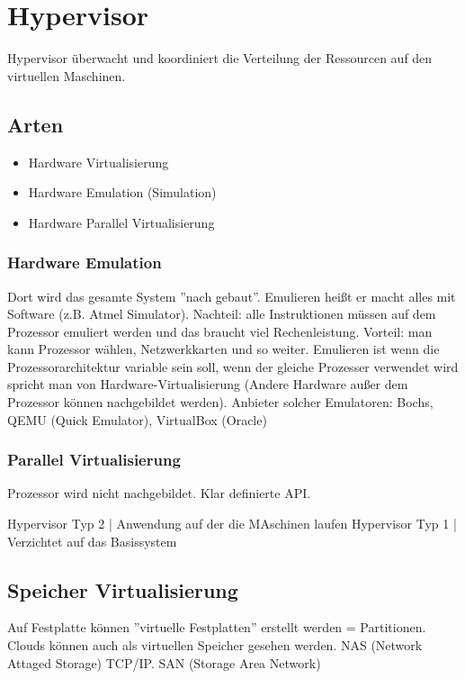 \documentclass[a4paper]{report}
\begin{document}
\section{Hypervisor}

Hypervisor überwacht und koordiniert die Verteilung der Ressourcen auf den virtuellen Maschinen. 

 \subsection{Arten}
 
\begin{itemize}
\item Hardware Virtualisierung
\item Hardware Emulation (Simulation)
\item Hardware Parallel Virtualisierung
\end{itemize}


\subsubsection{Hardware Emulation}

Dort wird das gesamte System ''nach gebaut''. Emulieren heißt er macht alles mit Software (z.B. Atmel Simulator). Nachteil: alle Instruktionen müssen auf dem Prozessor emuliert werden und das braucht viel Rechenleistung. Vorteil: man kann Prozessor wählen, Netzwerkkarten und so weiter. Emulieren ist wenn die Prozessorarchitektur variable sein soll, wenn der gleiche Prozesser verwendet wird spricht man von Hardware-Virtualisierung (Andere Hardware außer dem Prozessor können nachgebildet werden).
\newline
\newline
Anbieter solcher Emulatoren: Bochs, QEMU (Quick Emulator), VirtualBox (Oracle)

\subsubsection{Parallel Virtualisierung}

Prozessor wird nicht nachgebildet. Klar definierte API.

Hypervisor Typ 2 | Anwendung auf der die MAschinen laufen
Hypervisor Typ 1 | Verzichtet auf das Basissystem


\subsection{Speicher Virtualisierung}

Auf Festplatte können ''virtuelle Festplatten'' erstellt werden = Partitionen. Clouds können auch als virtuellen Speicher gesehen werden. NAS (Network Attaged Storage) TCP/IP. SAN (Storage Area Network) 
\end{document}
